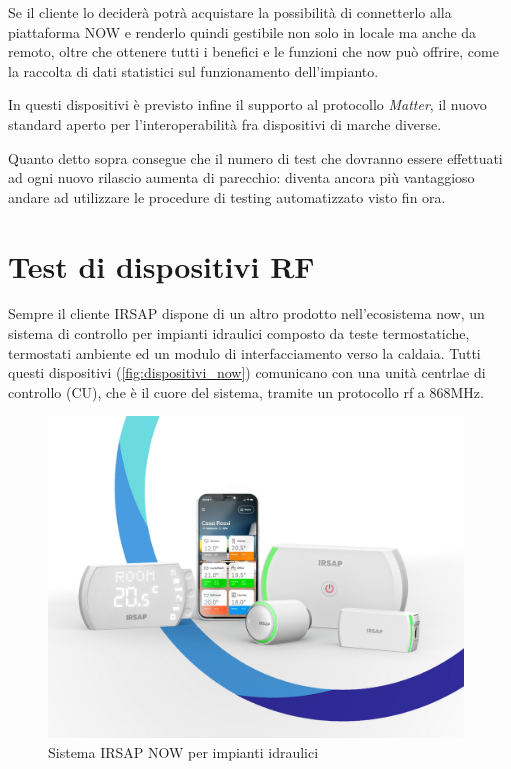 \documentclass[12pt,a4paper,twoside,titlepage]{book}
\begin{document}
Se il cliente lo deciderà potrà acquistare la possibilità di connetterlo alla piattaforma
NOW e renderlo quindi gestibile non solo in locale ma anche da remoto, oltre che
ottenere tutti i benefici e le funzioni che \Gls{now} può offrire, come la
raccolta di dati statistici sul funzionamento dell'impianto.

In questi dispositivi è previsto infine il supporto al protocollo \textit{Matter},
il nuovo standard aperto per l'interoperabilità fra dispositivi di marche diverse.

Quanto detto sopra consegue che il numero di test che dovranno essere effettuati ad
ogni nuovo rilascio aumenta di parecchio: diventa ancora più vantaggioso andare ad
utilizzare le procedure di testing automatizzato visto fin ora.

\section{Test di dispositivi RF}

Sempre il cliente IRSAP dispone di un altro prodotto nell'ecosistema \Gls{now},
un sistema di controllo per impianti idraulici composto da teste termostatiche,
termostati ambiente ed un modulo di interfacciamento verso la caldaia. Tutti questi
dispositivi (\autoref{fig:dispositivi_now}) comunicano con una unità centrlae di controllo
(CU), che è il cuore del sistema, tramite un protocollo \Gls{rf} a 868MHz.

\begin{figure}[h]
    \centering
    \includegraphics[width=11cm]{img/now.jpeg}
    \caption{Sistema IRSAP NOW per impianti idraulici}
    \label{fig:dispositivi_now}
\end{figure}
\end{document}
